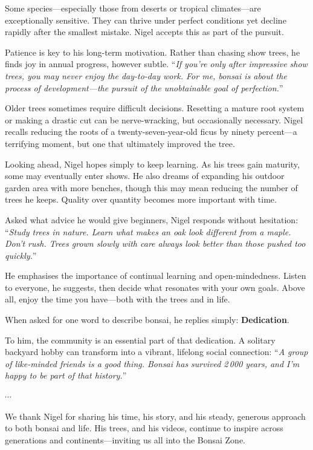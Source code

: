 Some species---especially those from deserts or tropical climates---are exceptionally sensitive.
They can thrive under perfect conditions yet decline rapidly after the smallest mistake.
Nigel accepts this as part of the pursuit.

Patience is key to his long\--term motivation.
Rather than chasing show trees, he finds joy in annual progress, however subtle.
``\textit{If you're only after impressive show trees, you may never enjoy the day\--to\--day work. For me, bonsai is about the process of development---the pursuit of the unobtainable goal of perfection.}''

Older trees sometimes require difficult decisions.
Resetting a mature root system or making a drastic cut can be nerve\--wracking, but occasionally necessary.
Nigel recalls reducing the roots of a twenty\--seven\--year\--old ficus by ninety percent---a terrifying moment, but one that ultimately improved the tree.

Looking ahead, Nigel hopes simply to keep learning.
As his trees gain maturity, some may eventually enter shows.
He also dreams of expanding his outdoor garden area with more benches, though this may mean reducing the number of trees he keeps.
Quality over quantity becomes more important with time.

\medskip
{}
\noindent
Asked what advice he would give beginners, Nigel responds without hesitation: ``\textit{Study trees in nature. Learn what makes an oak look different from a maple. Don't rush. Trees grown slowly with care always look better than those pushed too quickly.}''

He emphasises the importance of continual learning and open\--mindedness.
Listen to everyone, he suggests, then decide what resonates with your own goals.
Above all, enjoy the time you have---both with the trees and in life.

When asked for one word to describe bonsai, he replies simply: \textbf{Dedication}.

To him, the community is an essential part of that dedication.
A solitary backyard hobby can transform into a vibrant, lifelong social connection: ``\textit{A group of like\--minded friends is a good thing. Bonsai has survived 2\,000 years, and I'm happy to be part of that history.}''

\begin{center}
    $\cdots$
\end{center}

\noindent
We thank Nigel for sharing his time, his story, and his steady, generous approach to both bonsai and life.
His trees, and his videos, continue to inspire across generations and continents---inviting us all into the Bonsai Zone.
\closearticle

